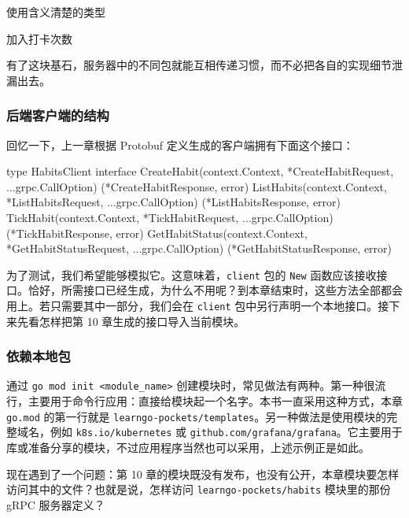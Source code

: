 \begin{codeannotations}
\item 使用含义清楚的类型
\item 加入打卡次数
\end{codeannotations}

有了这块基石，服务器中的不同包就能互相传递习惯，而不必把各自的实现细节泄漏出去。

\subsubsection{后端客户端的结构}

回忆一下，上一章根据 Protobuf 定义生成的客户端拥有下面这个接口：

\begin{gocode}[]
type HabitsClient interface {
    CreateHabit(context.Context,
        *CreateHabitRequest,
        ...grpc.CallOption) (*CreateHabitResponse, error)
    ListHabits(context.Context,
        *ListHabitsRequest,
        ...grpc.CallOption) (*ListHabitsResponse, error)
    TickHabit(context.Context,
        *TickHabitRequest,
        ...grpc.CallOption) (*TickHabitResponse, error)
    GetHabitStatus(context.Context,
        *GetHabitStatusRequest,
        ...grpc.CallOption) (*GetHabitStatusResponse, error)
}
\end{gocode}

为了测试，我们希望能够模拟它。这意味着，\texttt{client} 包的 \texttt{New} 函数应该接收接口。恰好，所需接口已经生成，为什么不用呢？到本章结束时，这些方法全部都会用上。若只需要其中一部分，我们会在 \texttt{client} 包中另行声明一个本地接口。接下来先看怎样把第 10 章生成的接口导入当前模块。

\subsubsection{依赖本地包}

通过 \texttt{go mod init <module\_name>} 创建模块时，常见做法有两种。第一种很流行，主要用于命令行应用：直接给模块起一个名字。本书一直采用这种方式，本章 \texttt{go.mod} 的第一行就是 \texttt{learngo-pockets/templates}。另一种做法是使用模块的完整域名，例如 \texttt{k8s.io/kubernetes} 或 \texttt{github.com/grafana/grafana}。它主要用于库或准备分享的模块，不过应用程序当然也可以采用，上述示例正是如此。

现在遇到了一个问题：第 10 章的模块既没有发布，也没有公开，本章模块要怎样访问其中的文件？也就是说，怎样访问 \texttt{learngo-pockets/habits} 模块里的那份 gRPC 服务器定义？

